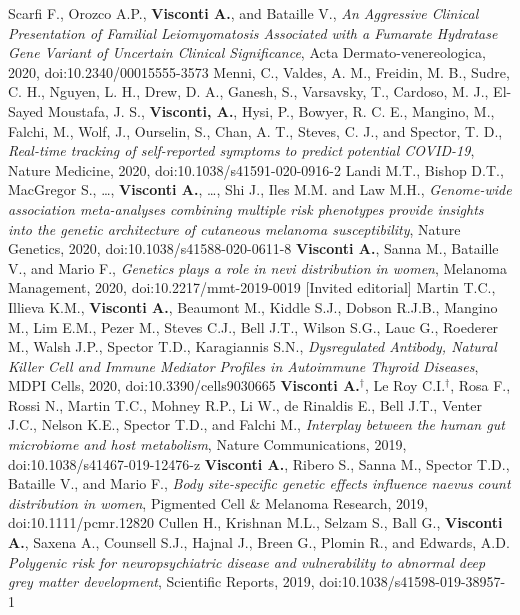 \documentclass[a4paper,10pt]{article}
\begin{document}
{\begin{itemize}
		 Scarfi F., Orozco A.P., \textbf{Visconti A.}, and Bataille V., \emph{An Aggressive Clinical Presentation of Familial Leiomyomatosis Associated with a Fumarate Hydratase Gene Variant of Uncertain Clinical Significance}, Acta Dermato-venereologica, 2020, doi:10.2340/00015555-3573	
		 Menni, C., Valdes, A. M., Freidin, M. B., Sudre, C. H., Nguyen, L. H., Drew, D. A., Ganesh, S., Varsavsky, T., Cardoso, M. J., El-Sayed Moustafa, J. S., \textbf{Visconti, A.}, Hysi, P., Bowyer, R. C. E., Mangino, M., Falchi, M., Wolf, J., Ourselin, S., Chan, A. T., Steves, C. J., and Spector, T. D., \emph{Real-time tracking of self-reported symptoms to predict potential COVID-19}, Nature Medicine, 2020, doi:10.1038/s41591-020-0916-2
		 Landi M.T., Bishop D.T., MacGregor S., \dots, \textbf{Visconti A.}, \dots, Shi J., Iles M.M. and Law M.H., \emph{Genome-wide association meta-analyses combining multiple risk phenotypes provide insights into the genetic architecture of cutaneous melanoma susceptibility}, Nature Genetics, 2020, doi:10.1038/s41588-020-0611-8	
		 \textbf{Visconti A.}, Sanna M., Bataille V., and Mario F., \emph{Genetics plays a role in nevi distribution in women}, Melanoma Management, 2020, doi:10.2217/mmt-2019-0019 [Invited editorial]
		 Martin T.C., Illieva K.M., \textbf{Visconti A.}, Beaumont M., Kiddle S.J., Dobson R.J.B., Mangino M., Lim E.M., Pezer M., Steves C.J., Bell J.T., Wilson S.G., Lauc G., Roederer M., Walsh J.P., Spector T.D., Karagiannis S.N., \emph{Dysregulated Antibody, Natural Killer Cell and Immune Mediator Profiles in Autoimmune Thyroid Diseases}, MDPI Cells, 2020, doi:10.3390/cells9030665
		 \textbf{Visconti A.}$^{\textbf{$\dag $}}$, Le Roy C.I.$^{\textbf{$\dag $}}$, Rosa F., Rossi N., Martin T.C., Mohney R.P., Li W., de Rinaldis E., Bell J.T., Venter J.C., Nelson K.E., Spector T.D., and Falchi M., \emph{Interplay between the human gut microbiome and host metabolism}, Nature Communications, 2019, doi:10.1038/s41467-019-12476-z
		 \textbf{Visconti A.}, Ribero S., Sanna M., Spector T.D., Bataille V., and Mario F., \emph{Body site-specific genetic effects influence naevus count distribution in women}, Pigmented Cell \& Melanoma Research, 2019, doi:10.1111/pcmr.12820
		 Cullen H., Krishnan M.L., Selzam S., Ball G., \textbf{Visconti A.}, Saxena A., Counsell S.J., Hajnal J., Breen G., Plomin R., and Edwards, A.D. \emph{Polygenic risk for neuropsychiatric disease and vulnerability to abnormal deep grey matter development}, Scientific Reports, 2019, doi:10.1038/s41598-019-38957-1

\end{itemize}}
\end{document}
